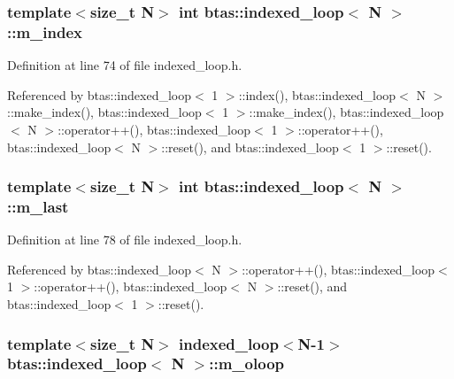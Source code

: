 \subsubsection[{m\-\_\-index}]{\setlength{\rightskip}{0pt plus 5cm}template$<$size\-\_\-t N$>$ int {\bf btas\-::indexed\-\_\-loop}$<$ N $>$\-::m\-\_\-index\hspace{0.3cm}{\ttfamily [private]}}\label{d4/d84/classbtas_1_1indexed__loop_ac53c3f4465df4baf4b8cc0f9f3824f68}


Definition at line 74 of file indexed\-\_\-loop.\-h.



Referenced by btas\-::indexed\-\_\-loop$<$ 1 $>$\-::index(), btas\-::indexed\-\_\-loop$<$ N $>$\-::make\-\_\-index(), btas\-::indexed\-\_\-loop$<$ 1 $>$\-::make\-\_\-index(), btas\-::indexed\-\_\-loop$<$ N $>$\-::operator++(), btas\-::indexed\-\_\-loop$<$ 1 $>$\-::operator++(), btas\-::indexed\-\_\-loop$<$ N $>$\-::reset(), and btas\-::indexed\-\_\-loop$<$ 1 $>$\-::reset().

\subsubsection[{m\-\_\-last}]{\setlength{\rightskip}{0pt plus 5cm}template$<$size\-\_\-t N$>$ int {\bf btas\-::indexed\-\_\-loop}$<$ N $>$\-::m\-\_\-last\hspace{0.3cm}{\ttfamily [private]}}\label{d4/d84/classbtas_1_1indexed__loop_a19e3b5fe0657aeb3f849ac9ca11c8d44}


Definition at line 78 of file indexed\-\_\-loop.\-h.



Referenced by btas\-::indexed\-\_\-loop$<$ N $>$\-::operator++(), btas\-::indexed\-\_\-loop$<$ 1 $>$\-::operator++(), btas\-::indexed\-\_\-loop$<$ N $>$\-::reset(), and btas\-::indexed\-\_\-loop$<$ 1 $>$\-::reset().

\subsubsection[{m\-\_\-oloop}]{\setlength{\rightskip}{0pt plus 5cm}template$<$size\-\_\-t N$>$ {\bf indexed\-\_\-loop}$<$N-\/1$>$ {\bf btas\-::indexed\-\_\-loop}$<$ N $>$\-::m\-\_\-oloop\hspace{0.3cm}{\ttfamily [private]}}\label{d4/d84/classbtas_1_1indexed__loop_a1822b86cdcb21caa943d899109a786ec}



